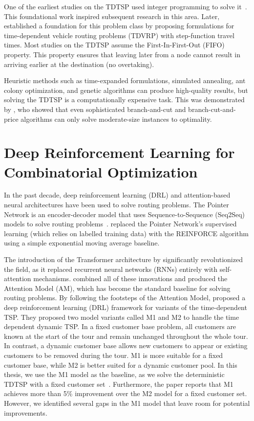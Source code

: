 One of the earliest studies on the TDTSP used integer programming to solve it~\citep{picard1978}.
This foundational work inspired subsequent research in this area. Later, \citet{malandraki1992} established a foundation for this problem class
by proposing formulations for time-dependent vehicle routing problems (TDVRP) with
step-function travel times. Most studies on the TDTSP assume the First-In-First-Out
(FIFO) property. This property ensures that leaving later from a node cannot result in
arriving earlier at the destination (no overtaking).

Heuristic methods such as time-expanded formulations, simulated annealing, ant colony
optimization, and genetic algorithms can produce high-quality results, but solving the
TDTSP is a computationally expensive task. This was demonstrated by \citet{cordeau2014},
who showed that even sophisticated branch-and-cut and branch-cut-and-price algorithms
can only solve moderate-size instances to optimality.

\section{Deep Reinforcement Learning for Combinatorial Optimization}

In the past decade, deep reinforcement learning (DRL) and attention-based neural
architectures have been used to solve routing problems. The Pointer Network is an
encoder-decoder model that uses Sequence-to-Sequence (Seq2Seq) models to solve
routing problems~\citep{vinyals2015pointer}. \citet{bello2017}
replaced the Pointer Network's supervised learning (which relies on labelled training
data) with the REINFORCE algorithm using a simple exponential moving average baseline.

The introduction of the Transformer architecture by \citet{vaswani2017} significantly
revolutionized the field, as it replaced recurrent neural networks (RNNs) entirely with
self-attention mechanisms. \citet{kool2019} combined all of these innovations and
produced the Attention Model (AM), which has become the standard baseline for solving
routing problems. By following the footsteps of the Attention Model, \citet{zhang2023}
proposed a deep reinforcement learning (DRL) framework for variants of the
time-dependent TSP. They proposed two model variants called M1 and M2 to handle the
time dependent dynamic TSP. In a fixed customer base problem, all customers are known
at the start of the tour and remain unchanged throughout the whole tour. In contrast, a
dynamic customer base allows new customers to appear or existing customers to be removed
during the tour. M1 is more suitable for a fixed customer base, while M2 is better
suited for a dynamic customer pool. In this thesis, we use the M1 model as the
baseline, as we solve the deterministic TDTSP with a fixed customer set~\citep{zhang2023}.
Furthermore, the paper reports that M1 achieves more than 5\% improvement over the M2
model for a fixed customer set. However, we identified several gaps in the M1 model
that leave room for potential improvements.

